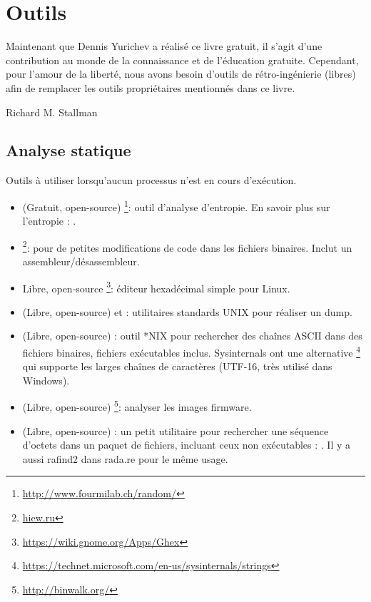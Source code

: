 \chapter{Outils}

\epigraph{Maintenant que Dennis Yurichev a réalisé ce livre gratuit, il s'agit d'une contribution au monde de la connaissance et de l'éducation gratuite.
Cependant, pour l'amour de la liberté, nous avons besoin d'outils de rétro-ingénierie (libres) afin de remplacer les outils propriétaires mentionnés dans ce livre.}{Richard M. Stallman}

\section{Analyse statique}

Outils à utiliser lorsqu'aucun processus n'est en cours d'exécution.


\begin{itemize}
\item
(Gratuit, open-source) \footnote{\url{http://www.fourmilab.ch/random/}}: outil d'analyse d'entropie.
En savoir plus sur l'entropie : .

\item
\label{Hiew}
\footnote{\href{http://go.yurichev.com/17035}{hiew.ru}}:
pour de petites modifications de code dans les fichiers binaires.
Inclut un assembleur/désassembleur.

\item {Libre, open-source} \footnote{\url{https://wiki.gnome.org/Apps/Ghex}}: éditeur
hexadécimal simple pour Linux.

\item (Libre, open-source)  et : utilitaires standards UNIX pour réaliser un dump.

\item (Libre, open-source) : outil *NIX pour rechercher des chaînes ASCII dans des fichiers binaires, fichiers exécutables inclus.
Sysinternals ont une alternative \footnote{\url{https://technet.microsoft.com/en-us/sysinternals/strings}}
qui supporte les larges chaînes de caractères (UTF-16, très utilisé dans Windows).

\item (Libre, open-source) \footnote{\url{http://binwalk.org/}}: analyser les images firmware.

\item
{}
(Libre, open-source) :
un petit utilitaire pour rechercher une séquence d'octets dans un paquet de fichiers,
incluant ceux non exécutables : \BGREPURL.
Il y a aussi rafind2 dans rada.re pour le même usage.
\end{itemize}

